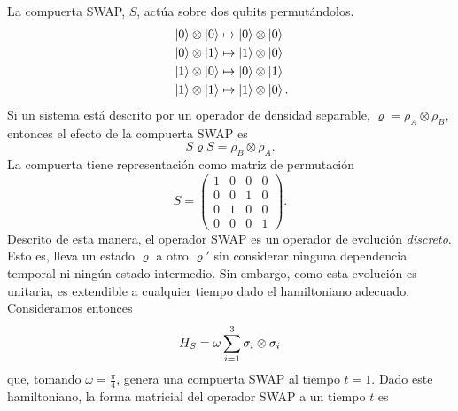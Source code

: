 La compuerta SWAP, $S$, actúa sobre dos qubits permutándolos.  
\begin{align}
    \ket{0}\otimes\ket{0}&\mapsto\ket{0}\otimes\ket{0}\nonumber\\
    \ket{0}\otimes\ket{1}&\mapsto\ket{1}\otimes\ket{0}\nonumber\\
    \ket{1}\otimes\ket{0}&\mapsto\ket{0}\otimes\ket{1}\nonumber\\
    \ket{1}\otimes\ket{1}&\mapsto\ket{1}\otimes\ket{0} \rlap{.}\nonumber
\end{align}
Si un sistema está descrito por un operador de densidad separable, $\varrho=\rho_{A}\otimes\rho_{B}$, entonces el efecto de la compuerta SWAP es 
\begin{equation}
    S\varrho S=\rho_{B}\otimes\rho_{A}.\nonumber
\end{equation}
La compuerta tiene representación como matriz de permutación
\begin{equation}
    S=\begin{pmatrix}
        1&0&0&0\\
        0&0&1&0\\
        0&1&0&0\\
        0&0&0&1
    \end{pmatrix}.\nonumber
\end{equation}
Descrito de esta manera, el operador SWAP es un operador de evolución \textit{discreto}. Esto es, lleva un estado $\varrho$ a otro $\varrho'$ sin considerar ninguna dependencia temporal ni ningún estado intermedio. Sin embargo, como esta evolución es unitaria, es extendible a cualquier tiempo dado el hamiltoniano adecuado. Consideramos entonces
\begin{equation}
  H_{S}=\omega\sum_{i=1}^{3}\sigma_{i}\otimes\sigma_{i}\nonumber
\end{equation}
que, tomando $\omega=\frac{\pi}{4}$, genera una compuerta SWAP al tiempo $t=1$. Dado este hamiltoniano, la forma matricial del operador \textsc{SWAP} a un tiempo $t$ es
